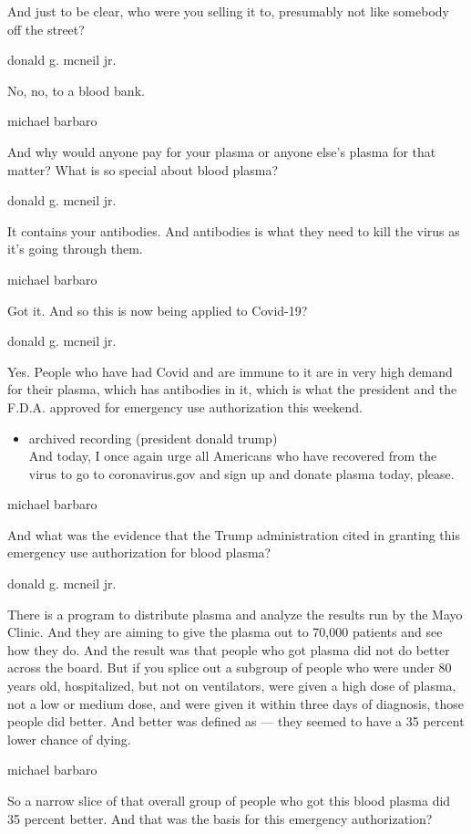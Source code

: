 And just to be clear, who were you selling it to, presumably not like
somebody off the street?

donald g. mcneil jr.

No, no, to a blood bank.

michael barbaro

And why would anyone pay for your plasma or anyone else's plasma for
that matter? What is so special about blood plasma?

donald g. mcneil jr.

It contains your antibodies. And antibodies is what they need to kill
the virus as it's going through them.

michael barbaro

Got it. And so this is now being applied to Covid-19?

donald g. mcneil jr.

Yes. People who have had Covid and are immune to it are in very high
demand for their plasma, which has antibodies in it, which is what the
president and the F.D.A. approved for emergency use authorization this
weekend.

\begin{itemize}
\tightlist
\item
  archived recording (president donald trump)\\
  And today, I once again urge all Americans who have recovered from the
  virus to go to coronavirus.gov and sign up and donate plasma today,
  please.
\end{itemize}

michael barbaro

And what was the evidence that the Trump administration cited in
granting this emergency use authorization for blood plasma?

donald g. mcneil jr.

There is a program to distribute plasma and analyze the results run by
the Mayo Clinic. And they are aiming to give the plasma out to 70,000
patients and see how they do. And the result was that people who got
plasma did not do better across the board. But if you splice out a
subgroup of people who were under 80 years old, hospitalized, but not on
ventilators, were given a high dose of plasma, not a low or medium dose,
and were given it within three days of diagnosis, those people did
better. And better was defined as --- they seemed to have a 35 percent
lower chance of dying.

michael barbaro

So a narrow slice of that overall group of people who got this blood
plasma did 35 percent better. And that was the basis for this emergency
authorization?

